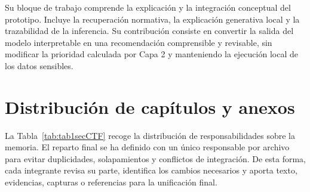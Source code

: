 Su bloque de trabajo comprende la explicación y la integración conceptual del prototipo. Incluye la recuperación normativa, la explicación generativa local y la trazabilidad de la inferencia. Su contribución consiste en convertir la salida del modelo interpretable en una recomendación comprensible y revisable, sin modificar la prioridad calculada por Capa 2 y manteniendo la ejecución local de los datos sensibles.

\section{Distribución de capítulos y anexos}

La Tabla~\ref{tab:tab1secCTF} recoge la distribución de responsabilidades sobre la memoria. El reparto final se ha definido con un único responsable por archivo para evitar duplicidades, solapamientos y conflictos de integración. De esta forma, cada integrante revisa su parte, identifica los cambios necesarios y aporta texto, evidencias, capturas o referencias para la unificación final.

